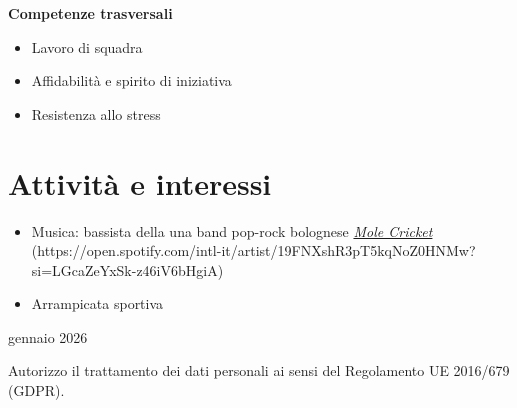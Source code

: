 \documentclass[a4paper,11pt]{article}
\begin{document}
\textbf{Competenze trasversali}
\begin{itemize}[noitemsep]
    \item Lavoro di squadra
    \item Affidabilità e spirito di iniziativa
    \item Resistenza allo stress
\end{itemize}

\section*{Attività e interessi}
\begin{itemize}[noitemsep]
    \item Musica: bassista della una band pop-rock bolognese \textit{\href{https://open.spotify.com/intl-it/artist/19FNXshR3pT5kqNoZ0HNMw?si=x-zhnzYdR_ODpyBLZJ8kiw}{Mole Cricket}}  \\ \small{(https://open.spotify.com/intl-it/artist/19FNXshR3pT5kqNoZ0HNMw?si=LGcaZeYxSk-z46iV6bHgiA)}
    \item Arrampicata sportiva
\end{itemize}


\vspace*{\fill}
\hfill {} gennaio 2026

\vspace*{4cm}
\footnotesize
Autorizzo il trattamento dei dati personali ai sensi del Regolamento UE 2016/679 (GDPR).
\end{document}

